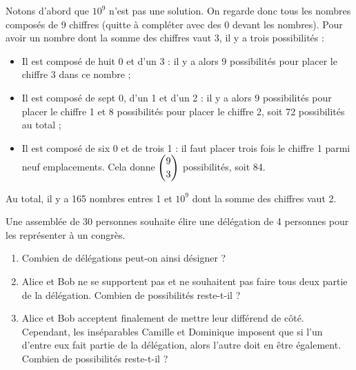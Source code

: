 \documentclass[11pt,fleqn, openany]{book} %
\begin{document}
\begin{solution}Notons d'abord que $10^9$ n'est pas une solution. On regarde donc tous les nombres composés de 9 chiffres (quitte à compléter avec des 0 devant les nombres). Pour avoir un nombre dont la somme des chiffres vaut 3, il y a trois possibilités :
\begin{itemize}
\item Il est composé de huit 0 et d'un 3 : il y a alors 9 possibilités pour placer le chiffre 3 dans ce nombre ;
\item Il est composé de sept 0, d'un 1 et d'un 2 : il y a alors 9 possibilités pour placer le chiffre 1 et 8 possibilités pour placer le chiffre 2, soit 72 possibilités au total ;
\item Il est composé de six 0 et de trois 1 : il faut placer trois fois le chiffre 1 parmi neuf emplacements. Cela donne $\dbinom{9}{3}$ possibilités, soit 84.
\end{itemize}

Au total, il y a 165 nombres entres 1 et $10^9$ dont la somme des chiffres vaut 2.\end{solution}




\begin{exercise}[topic=comb04]
Une assemblée de 30 personnes souhaite élire une délégation de 4 personnes pour les représenter à un congrès.
\begin{enumerate}
\item Combien de délégations peut-on ainsi désigner ?
\item Alice et Bob ne se supportent pas et ne souhaitent pas faire tous deux partie de la délégation. Combien de possibilités reste-t-il ?
\item Alice et Bob acceptent finalement de mettre leur différend de côté. Cependant, les inséparables Camille et Dominique imposent que si l'un d'entre eux fait partie de la délégation, alors l'autre doit en être également. Combien de possibilités reste-t-il ?
\end{enumerate}
\newpage \end{exercise}
\end{document}
